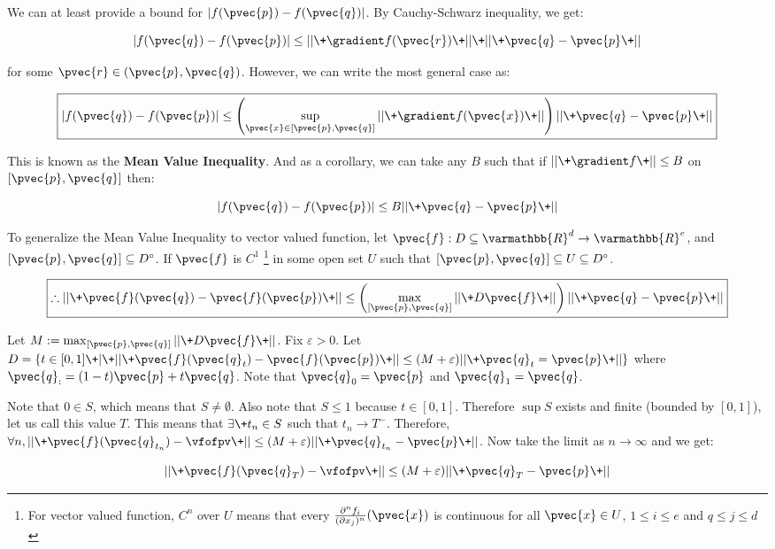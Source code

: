 \documentclass[11 pt, twoside]{article}
\begin{document}
We can at least provide a bound for $|f(\pvec{p}) - f(\pvec{q})|$. By
Cauchy-Schwarz inequality, we get:

$$|f(\pvec{q}) - f(\pvec{p})| \leq ||\+\gradient f(\pvec{r})\+||\+ ||\+\pvec{q} -
\pvec{p}\+||$$

for some $\pvec{r} \in (\pvec{p}, \pvec{q})$. However, we can write the most
general case as:

$$\boxed{|f(\pvec{q}) - f(\pvec{p})| \leq \left(\sup_{\pvec{x} \in [\pvec{p} , \pvec{q}]}
||\+\gradient f(\pvec{x})\+||\right) ||\+\pvec{q} - \pvec{p}\+||}$$

This is known as the \textbf{Mean Value Inequality}. And as a corollary, we can
take any $B$ such that if $ ||\+\gradient f\+|| \leq B$ on $[\pvec{p}, \pvec{q}]$
then:

$$|f(\pvec{q}) - f(\pvec{p})| \leq B ||\+\pvec{q} - \pvec{p}\+||$$

To generalize the Mean Value Inequality to vector valued function, let $\pvec{f}:
D \subseteq \varmathbb{R}^d \to \varmathbb{R}^e$, and $[\pvec{p}, \pvec{q}]
\subseteq D^\circ$. If $\pvec{f}$ is $C^1$ \footnote{For vector valued function,
$C^n$ over $U$ means that every $\frac{\partial^n f_i}{(\partial x_j)^n}(\pvec{x})$ is
continuous for all $\pvec{x} \in U$, $1 \leq i \leq e$ and $q \leq j \leq d$} in
some open set $U$ such that $[\pvec{p}, \pvec{q}] \subseteq U \subseteq D^\circ$.

$$\boxed{\therefore ||\+\pvec{f}(\pvec{q}) - \pvec{f}(\pvec{p})\+|| \leq
\left(\max_{[\pvec{p}, \pvec{q}]} ||\+D\pvec{f}\+||\right) ||\+\pvec{q} -
\pvec{p}\+||}$$

Let $M := \max_{[\pvec{p}, \pvec{q}]} ||\+D\pvec{f}\+||$. Fix $\varepsilon > 0$.
Let $D = \{t \in [0, 1] \+|\+ ||\+\pvec{f}(\pvec{q}_t) - \pvec{f}(\pvec{p})\+|| \leq
(M + \varepsilon) ||\+\pvec{q}_t = \pvec{p}\+||\}$ where $\pvec{q}_:= (1 -
t)\pvec{p} + t\pvec{q}$. Note that $\pvec{q}_0 = \pvec{p}$ and $\pvec{q}_1 =
\pvec{q}$.

Note that $0 \in S$, which means that $S \neq \emptyset$. Also note that $S \leq
1$ because $t \in [0, 1]$. Therefore $\sup S$ exists and finite (bounded by $[0,
1]$), let us call this value $T$. This means that $\exists\+ t_n \in S$ such
that $t_n \to T^-$. Therefore, $\forall n, ||\+\pvec{f}(\pvec{q}_{t_n}) -
\vfofpv\+|| \leq (M + \varepsilon) ||\+\pvec{q}_{t_n} - \pvec{p}\+||$. Now take the
limit as $n \to \infty$ and we get:

$$ ||\+\pvec{f}(\pvec{q}_T) - \vfofpv\+|| \leq (M + \varepsilon) ||\+\pvec{q}_T
- \pvec{p}\+||$$
\end{document}
